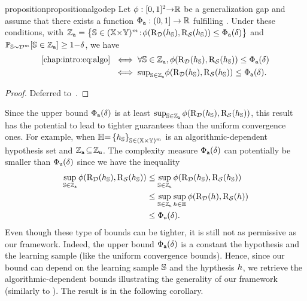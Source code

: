 \begin{restatable}{proposition}{propositionalgodep}\label{chap:dis-mu:proposition:algorithmic}
Let $\phi: [0,1]^2{\to}\Rbb$ be a generalization gap and assume that there exists a function $\PhiA: (0,1]\to\Rbb$ fulfilling .
Under these conditions, with $\setA = \big\{ \S\in (\X{\times}\Y)^\m \!:\! \phi(\Risk_{\D}(\h_{\S}), \Risk_{\dS}(\h_{\S}))\le\PhiA(\delta) \big\}$ and $\PP_{\S{\sim}\D^\m}\!\LB \S\in\setA \RB\ge  1{-}\delta$, we have
\begin{align*}
    \text{\Cref{chap:intro:eq:algo}}\ &\iff \forall\S\in\setA,  \phi(\Risk_{\D}(\h_{\S}), \Risk_{\dS}(\h_{\S})) \le \PhiA(\delta)\\
    &\iff {\textstyle \sup_{\S\in\setA}} \phi(\Risk_{\D}(\h_{\S}), \Risk_{\dS}(\h_{\S})) \le \PhiA(\delta). 
\end{align*}
\end{restatable}
\begin{noaddcontents}\begin{proof}
Deferred to~.
\end{proof}\end{noaddcontents}
Since the upper bound $\PhiA(\delta)$ is at least $\sup_{\S\in\setA}\phi(\Risk_{\D}(\h_{\S}), \Risk_{\dS}(\h_{\S}))$, this result has the potential to lead to tighter guarantees than the uniform convergence ones.
For example, when $\H {=} \LC \h_{\S}\RC_{\S\in(\X{\times}\Y)^\m}$ is an algorithmic-dependent hypothesis set and $\setA\!\subseteq\!\setUC$.
The complexity measure $\PhiA(\delta)$ can potentially be smaller than $\PhiUC(\delta)$ since we have the inequality 
\begin{align*}
\sup_{\S\in\setA}\phi(\Risk_{\D}(\h_{\S}), \Risk_{\dS}(\h_{\S})) &\le \sup_{\S\in\setUC}\phi(\Risk_{\D}(\h_{\S}), \Risk_{\dS}(\h_{\S}))\\
&\le \sup_{\S\in\setUC}\sup_{\h\in\H}\phi(\Risk_{\D}(\h), \Risk_{\dS}(\h))\\
&\le \PhiUC(\delta).
\end{align*}
Even though these type of bounds can be tighter, it is still not as permissive as our framework.
Indeed, the upper bound $\PhiA(\delta)$ is a constant \wrt the hypothesis and the learning sample (like the uniform convergence bounds).
Hence, since our bound can depend on the learning sample $\S$ and the hypthesis $\h$, we retrieve the algorithmic-dependent bounds illustrating the generality of our framework (similarly to ).
The result is in the following corollary.

